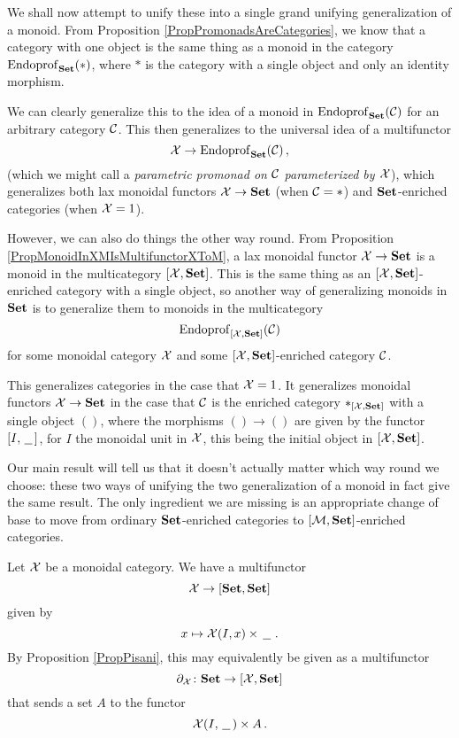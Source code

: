 We shall now attempt to unify these into a single grand unifying generalization of a monoid.
From Proposition \ref{PropPromonadsAreCategories}, we know that a category with one object is the same thing as a monoid in the category $\operatorname{Endoprof}_{\normalfont\textbf{Set}}(*)$, where $*$ is the category with a single object and only an identity morphism.

We can clearly generalize this to the idea of a monoid in $\operatorname{Endoprof}_{\normalfont\textbf{Set}}({\mathcal{C}})$ for an arbitrary category ${\mathcal{C}}$.  
This then generalizes to the universal idea of a multifunctor
\[
  \mathcal X \to \operatorname{Endoprof}_{\normalfont\textbf{Set}}({\mathcal{C}})\,,
  \]
(which we might call a \emph{parametric promonad on ${\mathcal{C}}$ parameterized by $\mathcal X$}), which generalizes both lax monoidal functors $\mathcal X \to {\normalfont\textbf{Set}}$ (when ${\mathcal{C}}=*$) and ${\normalfont\textbf{Set}}$-enriched categories (when $\mathcal X=1$).

However, we can also do things the other way round.  
From Proposition \ref{PropMonoidInXMIsMultifunctorXToM}, a lax monoidal functor $\mathcal X \to {\normalfont\textbf{Set}}$ is a monoid in the multicategory $[\mathcal X,{\normalfont\textbf{Set}}]$.  
This is the same thing as an $[\mathcal X,{\normalfont\textbf{Set}}]$-enriched category with a single object, so another way of generalizing monoids in ${\normalfont\textbf{Set}}$ is to generalize them to monoids in the multicategory
\[
  \operatorname{Endoprof}_{[\mathcal X,{\normalfont\textbf{Set}}]}({\mathcal{C}})
  \]
for some monoidal category $\mathcal X$ and some $[\mathcal X,{\normalfont\textbf{Set}}]$-enriched category ${\mathcal{C}}$.

This generalizes categories in the case that $\mathcal X=1$.  
It generalizes monoidal functors $\mathcal X \to {\normalfont\textbf{Set}}$ in the case that ${\mathcal{C}}$ is the enriched category $*_{[\mathcal X,{\normalfont\textbf{Set}}]}$ with a single object $()$, where the morphisms $() \to ()$ are given by the functor $[I,\,\underline{\hspace{1.5ex}}\,]$, for $I$ the monoidal unit in $\mathcal X$, this being the initial object in $[\mathcal X,{\normalfont\textbf{Set}}]$.

Our main result will tell us that it doesn't actually matter which way round we choose: these two ways of unifying the two generalization of a monoid in fact give the same result.  
The only ingredient we are missing is an appropriate change of base to move from ordinary ${\normalfont\textbf{Set}}$-enriched categories to $[\mathcal M,{\normalfont\textbf{Set}}]$-enriched categories.

\begin{definition}
  Let $\mathcal X$ be a monoidal category.  
  We have a multifunctor
  \[
    \mathcal X \to [{\normalfont\textbf{Set}},{\normalfont\textbf{Set}}]
    \]
  given by
  \[
    x \mapsto \mathcal X(I,x) \times \,\underline{\hspace{1.5ex}}\,\,.
    \]
  By Proposition \ref{PropPisani}, this may equivalently be given as a multifunctor
  \[
    \partial_\mathcal X\colon{\normalfont\textbf{Set}} \to [\mathcal X,{\normalfont\textbf{Set}}]
    \]
  that sends a set $A$ to the functor
  \[
    \mathcal X(I,\,\underline{\hspace{1.5ex}}\,)\times A\,.
    \]
\end{definition}

